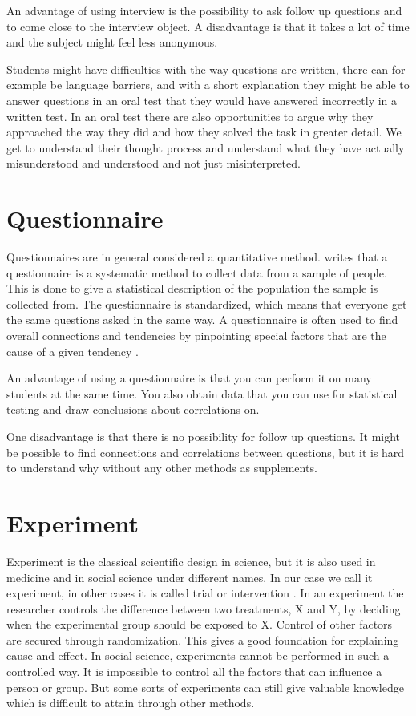 \bigskip\noindent
An advantage of using interview is the possibility to ask follow up questions and to come close to the interview object.
A disadvantage is that it takes a lot of time and the subject might feel less anonymous.

\bigskip\noindent
Students might have difficulties with the way questions are written, there can for example be language barriers, and with a short explanation they might be able to answer questions in an oral test that they would have answered incorrectly in a written test. In an oral test there are also opportunities to argue why they approached the way they did and how they solved the task in greater detail. We get to understand their thought process and understand what they have actually misunderstood and understood and not just misinterpreted.  

\section{Questionnaire}
Questionnaires are in general considered a quantitative method.  writes that a questionnaire is a systematic method to collect data from a sample of people. This is done to give a statistical description of the population the sample is collected from. The questionnaire is standardized, which means that everyone get the same questions asked in the same way. A questionnaire is often used to find overall connections and tendencies by pinpointing special factors that are the cause of a given tendency \cite{tjora2012kvalitative}. 

\bigskip\noindent
An advantage of using a questionnaire is that you can perform it on many students at the same time. You also obtain data that you can use for statistical testing and draw conclusions about correlations on. 

\bigskip\noindent
One disadvantage is that there is no possibility for follow up questions. It might be possible to find connections and correlations between questions, but it is hard to understand why without any other methods as supplements.

\section{Experiment}
Experiment is the classical scientific design in science, but it is also used in medicine and in social science under different names. In our case we call it experiment, in other cases it is called trial or intervention \cite{ringdal2001enhet}. In an experiment the researcher controls the difference between two treatments, X and Y, by deciding when the experimental group should be exposed to X. Control of other factors are secured through randomization. This gives a good foundation for explaining cause and effect. In social science, experiments cannot be performed in such a controlled way. It is impossible to control all the factors that can influence a person or group. But some sorts of experiments can still give valuable knowledge which is difficult to attain through other methods.

